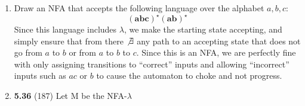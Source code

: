 \documentclass[12pt]{article}
\begin{document}
\begin{enumerate}
\item Draw an NFA that accepts the following language over the alphabet ${a,b,c}$:
  \[ \bm{(abc)^{\star}(ab)^{\star}} \]
  Since this language includes $\lambda$, we make the starting state accepting, and simply ensure that from there $\not\exists$ any path to an accepting state that does not go from $a$ to $b$ or from $a$ to $b$ to $c$. Since this is an NFA, we are perfectly fine with only assigning transitions to ``correct'' inputs and allowing ``incorrect'' inputs such as $ac$ or $b$ to cause the automaton to choke and not progress.

\begin{center}
          \end{center} 

\newpage

\item \textbf{5.36} (187) Let M be the NFA-$\lambda$
  

\end{enumerate}
\end{document}
